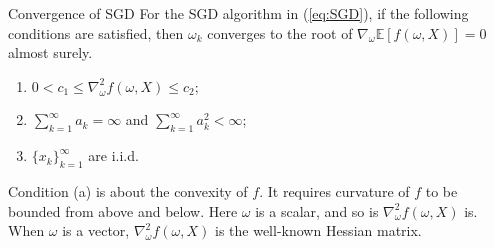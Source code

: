   \begin{theorem}{Convergence of SGD}
    \label{thm:SGD}
    For the SGD algorithm in (\ref{eq:SGD}), if the following conditions are satisfied, then $\omega_{k}$ converges to the
    root of $\nabla_{\omega} \mathbb{E}[f(\omega,X)]=0$ almost surely.
    \begin{enumerate}
      [label=(\alph*)]

      \item
            $0<c_{1} \le \nabla_{\omega}^{2}f(\omega,X) \le c_{2}$;
      \item
            $\sum_{k=1}^{\infty}a_{k}=\infty$ and $\sum_{k=1}^{\infty}a_{k}^{2}<\infty$;
      \item
            $\{x_{k}\}_{k=1}^{\infty}$ are i.i.d.

    \end{enumerate}

  \end{theorem}
  Condition (a) is about the convexity of $f$. It requires curvature of $f$ to be bounded from above and below. Here
  $\omega$ is a scalar, and so is $\nabla_{\omega}^{2}f(\omega,X)$ is. When $\omega$ is a vector,
  $\nabla_{\omega}^{2}f(\omega,X)$ is the well-known Hessian matrix.


